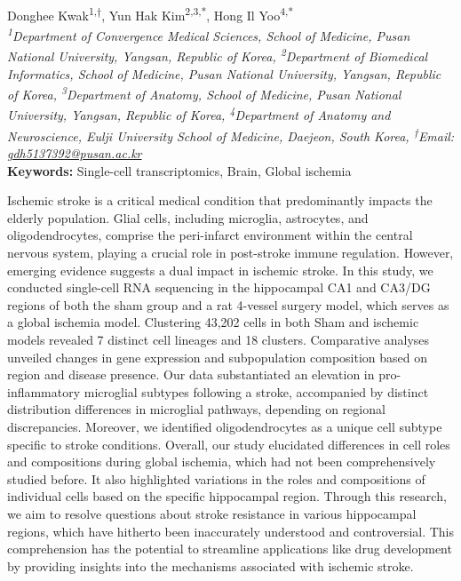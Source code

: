\begin{center}
Donghee Kwak\href{https://orcid.org/0009-0001-7014-3491}{\textcolor{orcidlogocol}{\aiOrcid}}\textsuperscript{1,†}, Yun Hak Kim\textsuperscript{2,3,*}, Hong Il Yoo\textsuperscript{4,*} \\
\vspace{0.2cm}
\textit{\textsuperscript{1}Department of Convergence Medical Sciences, School of Medicine, Pusan National University, Yangsan, Republic of Korea, \textsuperscript{2}Department of Biomedical Informatics, School of Medicine, Pusan National University, Yangsan, Republic of Korea, \textsuperscript{3}Department of Anatomy, School of Medicine, Pusan National University, Yangsan, Republic of Korea, \textsuperscript{4}Department of Anatomy and Neuroscience, Eulji University School of Medicine, Daejeon, South Korea, \textsuperscript{†}Email: \href{mailto:gdh5137392@pusan.ac.kr}{gdh5137392@pusan.ac.kr}} \\
\vspace{0.2cm}
\textbf{Keywords:} Single-cell transcriptomics, Brain, Global ischemia
\end{center}

\noindent
Ischemic stroke is a critical medical condition that predominantly impacts the elderly population. Glial cells, including microglia, astrocytes, and oligodendrocytes, comprise the peri-infarct environment within the central nervous system, playing a crucial role in post-stroke immune regulation. However, emerging evidence suggests a dual impact in ischemic stroke. In this study, we conducted single-cell RNA sequencing in the hippocampal CA1 and CA3/DG regions of both the sham group and a rat 4-vessel surgery model, which serves as a global ischemia model. Clustering 43,202 cells in both Sham and ischemic models revealed 7 distinct cell lineages and 18 clusters. Comparative analyses unveiled changes in gene expression and subpopulation composition based on region and disease presence. Our data substantiated an elevation in pro-inflammatory microglial subtypes following a stroke, accompanied by distinct distribution differences in microglial pathways, depending on regional discrepancies. Moreover, we identified oligodendrocytes as a unique cell subtype specific to stroke conditions. Overall, our study elucidated differences in cell roles and compositions during global ischemia, which had not been comprehensively studied before. It also highlighted variations in the roles and compositions of individual cells based on the specific hippocampal region. Through this research, we aim to resolve questions about stroke resistance in various hippocampal regions, which have hitherto been inaccurately understood and controversial. This comprehension has the potential to streamline applications like drug development by providing insights into the mechanisms associated with ischemic stroke.
\newpage


